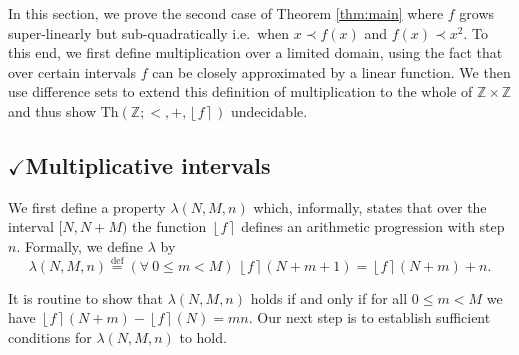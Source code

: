 \documentclass{amsart}
\theoremstyle{definition}
\newcommand{\nint}[1]{\left\lfloor #1 \right\rceil}
\newcommand{\ZZ}{\mathbb{Z}}
\newcommand{\theory}[1]{\mathrm{Th}(#1)}
\newcommand{\defeq}{\overset{\mathrm{def}}{=}}
\begin{document}
In this section, we prove the second case of Theorem \ref{thm:main} where $f$ grows super-linearly but sub-quadratically i.e.\ when $x \prec f(x)$ and $f(x) \prec x^2$. To this end, we first define multiplication over a limited domain, using the fact that over certain intervals $f$ can be closely approximated by a linear function. We then use difference sets to extend this definition of multiplication to the whole of $\ZZ \times \ZZ$ and thus show $\theory{\ZZ; <, +, \nint{f}}$ undecidable.

\subsection{$\checkmark$Multiplicative intervals}
\label{subsec:multiplicative-intervals}

We first define a property $\lambda(N,M,n)$ which, informally, states that over the interval $[N, N+M)$ the function $\nint{f}$ defines an arithmetic progression with step $n$. Formally, we define $\lambda$ by
\begin{equation*}
\lambda(N,M,n) \defeq (\forall\ 0 \leq m < M)\ \nint{f}(N+m+1) = \nint{f}(N+m)+n.
\end{equation*}

It is routine to show that $\lambda(N,M,n)$ holds if and only if for all $0 \leq m < M$ we have $\nint{f}(N+m) - \nint{f}(N) = mn$. Our next step is to establish sufficient conditions for $\lambda(N,M,n)$ to hold.
\end{document}
